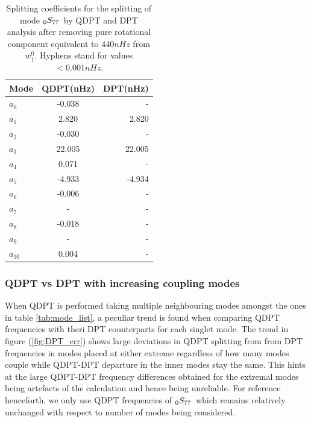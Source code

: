 \begin{table}
\begin{center}
\begin{tabular}{|l|c|r|}
\hline
\textbf{Mode} & \textbf{QDPT(nHz)} & \textbf{DPT(nHz)} \\ \hline
$a_{0}$ & \hfill -0.038 &\hfill  - \\ \hline
$a_{1}$ & \hfill  2.820 &\hfill  2.820 \\ \hline
$a_{2}$ & \hfill -0.030 &\hfill - \\ \hline
$a_{3}$ & \hfill 22.005 &\hfill 22.005 \\ \hline
$a_{4}$ & \hfill  0.071 &\hfill  - \\ \hline
$a_{5}$ & \hfill -4.933 &\hfill -4.934 \\ \hline
$a_{6}$ & \hfill -0.006 &\hfill  - \\ \hline
$a_{7}$ & \hfill  - &\hfill  - \\ \hline
$a_{8}$ & \hfill -0.018 &\hfill - \\ \hline
$a_{9}$ & \hfill - &\hfill  - \\ \hline
$a_{10}$ & \hfill  0.004 &\hfill  - \\ \hline
\end{tabular}
\end{center}
\caption{Splitting coefficients for the splitting of mode $_{0}S_{77}\,$ by QDPT and DPT analysis after removing pure rotational component equivalent to $440nHz$ from $w_1^0$. Hyphens stand for values $< 0.001nHz$.}
\label{tab:split_dr_rm}
\end{table}

\subsubsection{QDPT vs DPT with increasing coupling modes}
When QDPT is performed taking multiple neighbouring modes amongst the ones in table \ref{tab:mode_list}, a peculiar trend is found when comparing QDPT frequencies with theri DPT counterparts for each singlet mode. The trend in figure (\ref{fig:DPT_err}) shows large deviations in QDPT splitting from from DPT frequencies in modes placed at either extreme regardless of how many modes couple while QDPT-DPT departure in the inner modes stay the same. This hints at the large QDPT-DPT frequency differences obtained for the extremal modes being artefacts of the calculation and hence being unreliable. For reference henceforth, we only use QDPT frequencies of $_{0}S_{77}\,$ which remains relatively unchanged with respect to number of modes being considered.

